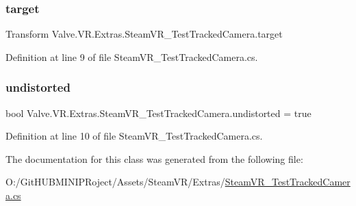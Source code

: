 \subsubsection{\texorpdfstring{target}{target}}
{\footnotesize\ttfamily Transform Valve.\+V\+R.\+Extras.\+Steam\+V\+R\+\_\+\+Test\+Tracked\+Camera.\+target}



Definition at line 9 of file Steam\+V\+R\+\_\+\+Test\+Tracked\+Camera.\+cs.

\mbox{\label{class_valve_1_1_v_r_1_1_extras_1_1_steam_v_r___test_tracked_camera_ae0bb1f5539c076d75d819f2b465ad58b}} 
\subsubsection{\texorpdfstring{undistorted}{undistorted}}
{\footnotesize\ttfamily bool Valve.\+V\+R.\+Extras.\+Steam\+V\+R\+\_\+\+Test\+Tracked\+Camera.\+undistorted = true}



Definition at line 10 of file Steam\+V\+R\+\_\+\+Test\+Tracked\+Camera.\+cs.



The documentation for this class was generated from the following file\+:\begin{DoxyCompactItemize}
\item 
O\+:/\+Git\+H\+U\+B\+M\+I\+N\+I\+P\+Roject/\+Assets/\+Steam\+V\+R/\+Extras/\mbox{\hyperlink{_steam_v_r___test_tracked_camera_8cs}{Steam\+V\+R\+\_\+\+Test\+Tracked\+Camera.\+cs}}\end{DoxyCompactItemize}

